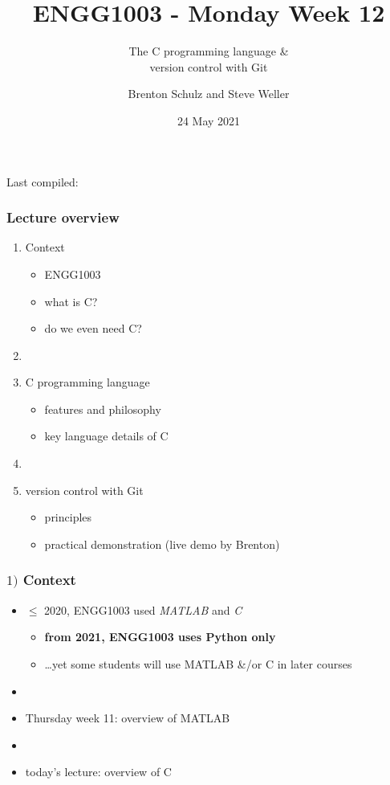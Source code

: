 \documentclass[english,14pt]{beamer}
\title{ENGG1003 - Monday Week 12}
\subtitle{The C programming language \& \\ version control with Git}
\author{Brenton Schulz and Steve Weller}
\institute{University of Newcastle}
\date{24 May 2021}
\newcommand\red[1]{{\color{red} #1}}
\begin{document}
\begin{flushleft}
{\scriptsize Last compiled:~\DTMnow}
\vspace*{-5mm}
\end{flushleft}
\framebreak


\begin{frame}[fragile]

\frametitle{Lecture overview}
\begin{enumerate}
	\item Context
	\begin{itemize}
		\item ENGG1003
		\item what is C?
		\item do we even need C?
	\end{itemize}
	\item[]
		\item C programming language
	\begin{itemize}
		\item features and philosophy
		\item key language details of C
	\end{itemize}
	\item[]
	\item version control with Git
		\begin{itemize}
			\item principles
			\item practical demonstration (live demo by Brenton)
		\end{itemize}		
\end{enumerate}

\end{frame}



\begin{frame}[fragile]

\frametitle{$1)$ Context}

\begin{itemize}
	\item $\leq$ 2020, ENGG1003 used \red{\emph{MATLAB}} and \red{\emph{C}}
	\begin{itemize}
		\item \textbf{from 2021, ENGG1003 uses Python only}
		\item \ldots yet some students will use MATLAB \&/or C in later courses
	\end{itemize}
	\item[]
	\item Thursday week 11: overview of MATLAB
	\item[]
	\item today's lecture: overview of C
\end{itemize}

\end{frame}
\end{document}
